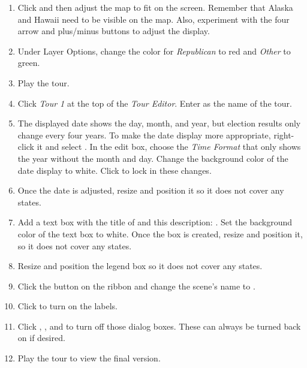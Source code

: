 \begin{enumbox}
\begin{enumerate}
		\item Click  and then adjust the map to fit on the screen. Remember that Alaska and Hawaii need to be visible on the map. Also, experiment with the four arrow and plus/minus buttons to adjust the display.
		\item Under Layer Options, change the color for \textit{Republican} to red and \textit{Other} to green.
		\item Play the tour.
		\item Click \textit{Tour 1} at the top of the \textit{Tour Editor}. Enter  as the name of the tour. 
		\item The displayed date shows the day, month, and year, but election results only change every four years. To make the date display more appropriate, right-click it and select . In the edit box, choose the \textit{Time Format} that only shows the year without the month and day. Change the background color of the date display to white. Click  to lock in these changes. 
		\item Once the date is adjusted, resize and position it so it does not cover any states. 
		\item Add a text box with the title of  and this description: . Set the background color of the text box to white. Once the box is created, resize and position it, so it does not cover any states.
		\item Resize and position the legend box so it does not cover any states.
		\item Click the  button on the ribbon and change the scene's name to .
		\item Click  to turn on the labels.
		\item Click , , and  to turn off those dialog boxes. These can always be turned back on if desired.
		\item Play the tour to view the final version.
		

\end{enumerate}
\end{enumbox}
